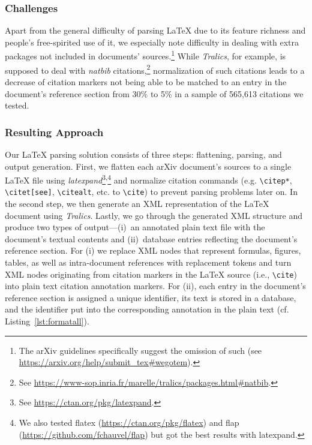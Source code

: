 \subsubsection{Challenges}\label{sec:refresolchallenges}
Apart from the general difficulty of parsing \LaTeX{} due to its feature richness and people's free-spirited use of it, we especially note difficulty in dealing with extra packages not included in documents' sources.\footnote{The arXiv guidelines specifically suggest the omission of such (see \url{https://arxiv.org/help/submit\_tex\#wegotem}).} While \textit{Tralics}, for example, is supposed to deal with \textit{natbib} citations,\footnote{See \url{https://www-sop.inria.fr/marelle/tralics/packages.html\#natbib}.} normalization of such citations leads to a decrease of citation markers not being able to be matched to an entry in the document's reference section from 30\% to 5\% in a sample of 565,613 citations we tested.

\subsubsection{Resulting Approach}
Our \LaTeX{} parsing solution consists of three steps: flattening, parsing, and output generation. First, we flatten each arXiv document's sources to a single \LaTeX{} file using \textit{latexpand}\footnote{See \url{https://ctan.org/pkg/latexpand}.}\textsuperscript{,}\footnote{We also tested flatex (\url{https://ctan.org/pkg/flatex}) and flap (\url{https://github.com/fchauvel/flap}) but got the best results with latexpand.} and normalize citation commands (e.g. \texttt{\textbackslash citep*}, \texttt{\textbackslash citet[see]}, \texttt{\textbackslash citealt}, etc. to \texttt{\textbackslash cite}) to prevent parsing problems later on. In the second step, we then generate an XML representation of the \LaTeX{} document using \textit{Tralics}. Lastly, we go through the generated XML structure and produce two types of output---(i)~an annotated plain text file with the document's textual contents and (ii)~database entries reflecting the document's reference section. For (i) we replace XML nodes that represent formulas, figures, tables, as well as intra-document references with replacement tokens and turn XML nodes originating from citation markers in the \LaTeX{} source (i.e., \texttt{\textbackslash cite}) into plain text citation annotation markers. For (ii), each entry in the document's reference section is assigned a unique identifier, its text is stored in a database, and the identifier put into the corresponding annotation in the plain text (cf. Listing~\ref{lst:formatall}).

